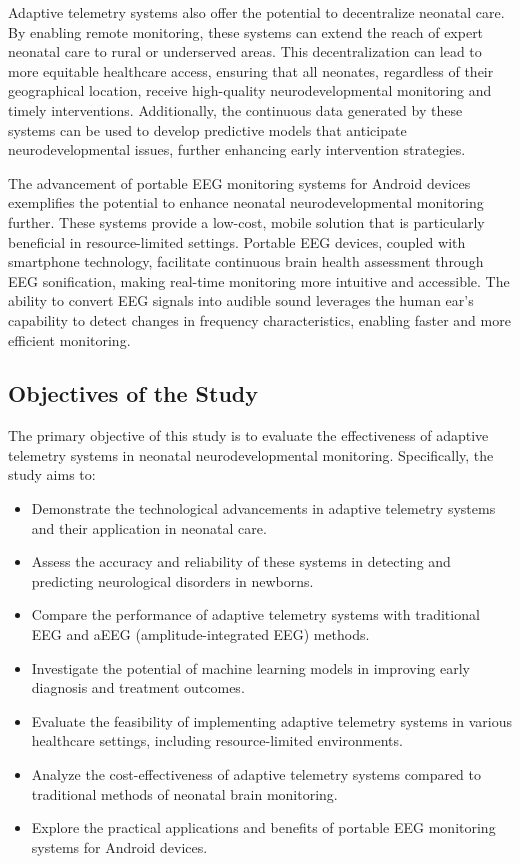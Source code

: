 \documentclass[12pt,journal,compsoc]{IEEEtran}
\begin{document}
Adaptive telemetry systems also offer the potential to decentralize neonatal care. By enabling remote monitoring, these systems can extend the reach of expert neonatal care to rural or underserved areas. This decentralization can lead to more equitable healthcare access, ensuring that all neonates, regardless of their geographical location, receive high-quality neurodevelopmental monitoring and timely interventions. Additionally, the continuous data generated by these systems can be used to develop predictive models that anticipate neurodevelopmental issues, further enhancing early intervention strategies.

The advancement of portable EEG monitoring systems for Android devices exemplifies the potential to enhance neonatal neurodevelopmental monitoring further. These systems provide a low-cost, mobile solution that is particularly beneficial in resource-limited settings. Portable EEG devices, coupled with smartphone technology, facilitate continuous brain health assessment through EEG sonification, making real-time monitoring more intuitive and accessible. The ability to convert EEG signals into audible sound leverages the human ear's capability to detect changes in frequency characteristics, enabling faster and more efficient monitoring.

\subsection{Objectives of the Study}
The primary objective of this study is to evaluate the effectiveness of adaptive telemetry systems in neonatal neurodevelopmental monitoring. Specifically, the study aims to:
\begin{itemize}
    \item Demonstrate the technological advancements in adaptive telemetry systems and their application in neonatal care.
    \item Assess the accuracy and reliability of these systems in detecting and predicting neurological disorders in newborns.
    \item Compare the performance of adaptive telemetry systems with traditional EEG and aEEG (amplitude-integrated EEG) methods.
    \item Investigate the potential of machine learning models in improving early diagnosis and treatment outcomes.
    \item Evaluate the feasibility of implementing adaptive telemetry systems in various healthcare settings, including resource-limited environments.
    \item Analyze the cost-effectiveness of adaptive telemetry systems compared to traditional methods of neonatal brain monitoring.
    \item Explore the practical applications and benefits of portable EEG monitoring systems for Android devices.
\end{itemize}
\end{document}
